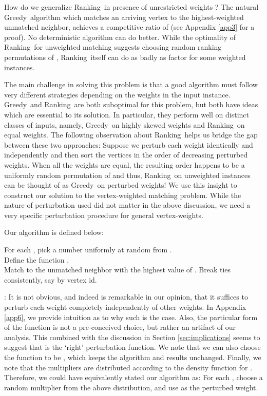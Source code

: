 \documentclass[11pt]{article}
\newcommand{\greedy}{{\sc Greedy}}
\newcommand{\ranking}{{\sc Ranking}}
\begin{document}
How do we generalize \ranking~in presence of unrestricted weights ? The natural \greedy~algorithm which matches an arriving vertex to the highest-weighted unmatched neighbor, achieves a competitive ratio of  (see
Appendix \ref{app3} for a proof). No deterministic algorithm can do
better. While the optimality of \ranking~for unweighted matching suggests choosing random ranking permutations of , \ranking~itself can do as badly as factor  for some weighted instances.

The main challenge in solving this problem
is that a good algorithm must follow very different strategies
depending on the weights in the input instance. \greedy~and
\ranking~are both suboptimal for this problem, but both have ideas
which are essential to its solution. In particular, they perform well
on distinct classes of inputs, namely, \greedy~on highly skewed
weights and \ranking~on equal weights. The following observation about \ranking~helps us bridge the gap between these two approaches: Suppose we perturb each weight  identically and independently and then sort the vertices in the order of decreasing perturbed weights. When all the weights are equal, the resulting order happens to be a uniformly random permutation of  and thus, \ranking~on unweighted instances can be thought of as \greedy~on perturbed weights! We use this insight to construct our solution to the vertex-weighted matching problem. While the nature of perturbation used did not matter in the above discussion, we need a very specific perturbation procedure for general vertex-weights.


Our algorithm is defined below:

\begin{algorithm}[H]
\caption{{\sc Perturbed-Greedy}} For each , pick a number
 uniformly at random from .\\
Define the function .\\
 { Match  to the unmatched neighbor
 with the highest value of . Break ties
consistently, say by vertex id. }
\end{algorithm}

: It is not obvious, and indeed is remarkable in
our opinion, that it suffices to perturb each weight  completely
independently of other weights. In Appendix \ref{app6}, we provide
intuition as to why such is the case. Also, the particular form of the
function  is not a pre-conceived choice, but rather an artifact
of our analysis. This combined with the discussion in Section
\ref{sec:implications} seems to suggest that  is the `right'
perturbation function. We note that we can also choose the function
 to be , which keeps the algorithm and results
unchanged. Finally, we note that the multipliers  are
distributed according to the density function 
for . Therefore, we could have
equivalently stated our algorithm as: For each , choose a
random multiplier  from the
above distribution, and use  as the perturbed weight.
\end{document}
